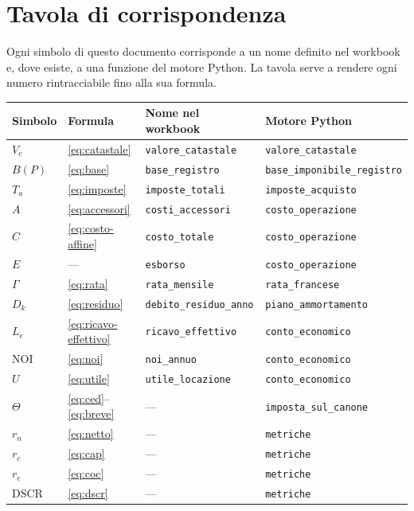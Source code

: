 \documentclass[11pt,a4paper]{article}
\theoremstyle{definition}
\theoremstyle{plain}
\begin{document}
\appendix

\section{Tavola di corrispondenza}

Ogni simbolo di questo documento corrisponde a un nome definito nel workbook e, dove esiste, a una funzione del motore Python. La tavola serve a rendere ogni numero rintracciabile fino alla sua formula.

\begin{table}[H]
\centering
\small
\begin{tabular}{@{}llll@{}}
\toprule
Simbolo & Formula & Nome nel workbook & Motore Python \\
\midrule
$V_c$ & \eqref{eq:catastale} & \texttt{valore\_catastale} & \texttt{valore\_catastale} \\
$B(P)$ & \eqref{eq:base} & \texttt{base\_registro} & \texttt{base\_imponibile\_registro} \\
$T_a$ & \eqref{eq:imposte} & \texttt{imposte\_totali} & \texttt{imposte\_acquisto} \\
$A$ & \eqref{eq:accessori} & \texttt{costi\_accessori} & \texttt{costo\_operazione} \\
$C$ & \eqref{eq:costo-affine} & \texttt{costo\_totale} & \texttt{costo\_operazione} \\
$E$ & --- & \texttt{esborso} & \texttt{costo\_operazione} \\
$\Gamma$ & \eqref{eq:rata} & \texttt{rata\_mensile} & \texttt{rata\_francese} \\
$D_k$ & \eqref{eq:residuo} & \texttt{debito\_residuo\_anno} & \texttt{piano\_ammortamento} \\
$L_e$ & \eqref{eq:ricavo-effettivo} & \texttt{ricavo\_effettivo} & \texttt{conto\_economico} \\
$\mathrm{NOI}$ & \eqref{eq:noi} & \texttt{noi\_annuo} & \texttt{conto\_economico} \\
$U$ & \eqref{eq:utile} & \texttt{utile\_locazione} & \texttt{conto\_economico} \\
$\Theta$ & \eqref{eq:ced}--\eqref{eq:breve} & --- & \texttt{imposta\_sul\_canone} \\
$r_n$ & \eqref{eq:netto} & --- & \texttt{metriche} \\
$r_c$ & \eqref{eq:cap} & --- & \texttt{metriche} \\
$r_e$ & \eqref{eq:coc} & --- & \texttt{metriche} \\
$\mathrm{DSCR}$ & \eqref{eq:dscr} & --- & \texttt{metriche} \\

\end{tabular}
\end{table}
\end{document}
